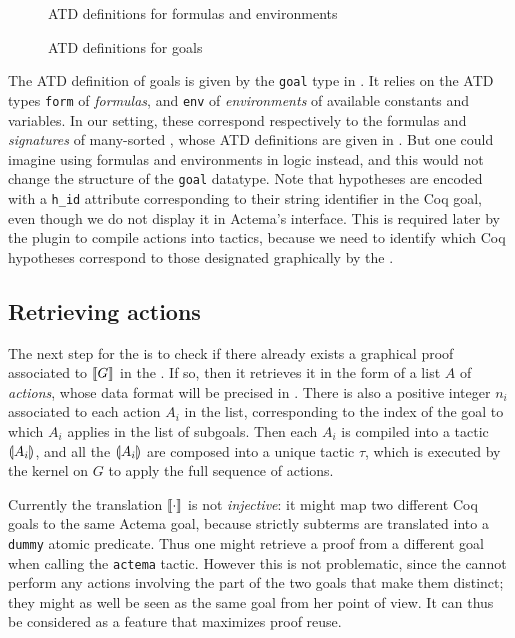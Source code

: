 \begin{figure}
  
  \caption{ATD definitions for  formulas and environments}
\end{figure}

\begin{figure}
  
  \caption{ATD definitions for goals}
\end{figure}

The ATD definition of goals is given by the \texttt{goal} type in
. It relies on
the ATD types \texttt{form} of \emph{formulas}, and \texttt{env} of
\emph{environments} of available constants and variables. In our setting, these
correspond respectively to the formulas and \emph{signatures} of many-sorted
, whose ATD definitions are given in . But one
could imagine using formulas and environments in  logic instead, and
this would not change the structure of the \texttt{goal} datatype. Note that
hypotheses are encoded with a \texttt{h\_id} attribute corresponding to their
string identifier in the Coq goal, even though we do not display it in Actema's
interface. This is required later by the plugin to compile actions into tactics,
because we need to identify which Coq hypotheses correspond to those designated
graphically by the .

\subsection{Retrieving actions}

The next step for the  is to check if there already exists a
graphical proof associated to $\llbracket G \rrbracket$ in the . If so,
then it retrieves it in the form of a list $A$ of \emph{actions}, whose data
format will be precised in . There is also a positive
integer $n_i$ associated to each action $A_i$ in the list, corresponding to the
index of the goal to which $A_i$ applies in the list of subgoals. Then each
$A_i$ is compiled into a tactic $\llparenthesis A_i \rrparenthesis$, and all the $\llparenthesis A_i \rrparenthesis$
are composed into a unique tactic $\tau$, which is executed by the kernel on $G$
to apply the full sequence of actions.

\begin{remark}
  Currently the translation $\llbracket \cdot \rrbracket$ is not \emph{injective}: it might
  map two different Coq goals to the same Actema goal, because strictly
   subterms are translated into a \texttt{dummy} atomic predicate.
  Thus one might retrieve a proof from a different goal when calling the
  \texttt{actema} tactic. However this is not problematic, since the
   cannot perform any actions involving the part of the two goals
  that make them distinct; they might as well be seen as the same goal from her
  point of view. It can thus be considered as a feature that maximizes proof
  reuse.
\end{remark}

